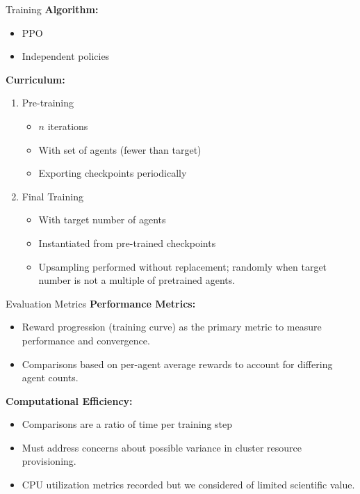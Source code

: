 \documentclass[xcolor={svgnames}]{beamer}
\begin{document}
\begin{frame}{Training}
    \textbf{Algorithm:}
    \begin{itemize}
        \item PPO
        \item Independent policies
    \end{itemize}

    \textbf{Curriculum:}
    \begin{enumerate}
        \item Pre-training
        \begin{itemize}
            \item $n$ iterations
            \item With set of agents (fewer than target)
            \item Exporting checkpoints periodically
        \end{itemize}
        \item Final Training
        \begin{itemize}
            \item With target number of agents
            \item Instantiated from pre-trained checkpoints
            \item Upsampling performed without replacement; 
                randomly when target number is not a multiple of pretrained agents.
        \end{itemize}
    \end{enumerate}
\end{frame}


\begin{frame}{Evaluation Metrics}
    \textbf{Performance Metrics:}
    \begin{itemize}
        \item Reward progression (training curve) as the primary metric to measure performance and convergence.
        \item Comparisons based on per-agent average rewards to account for differing agent counts.
    \end{itemize}

    \textbf{Computational Efficiency:}
    \begin{itemize}
        \item Comparisons are a ratio of time per training step
        \item Must address concerns about possible variance in cluster resource provisioning.
        \item CPU utilization metrics recorded but we considered of limited scientific value.
    \end{itemize}
\end{frame}
\end{document}
